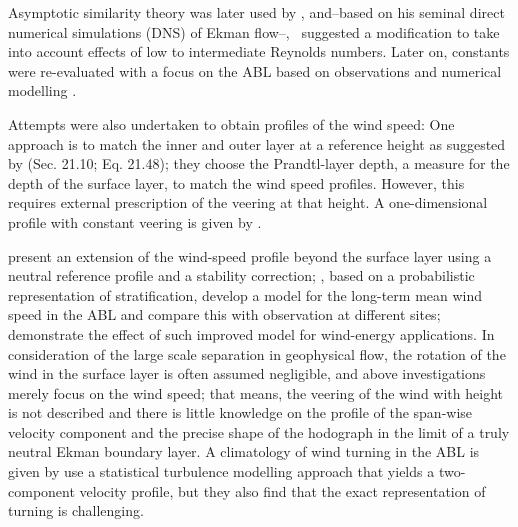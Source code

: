 \documentclass[smallcondensed,final]{svjour3}
\begin{document}
%
Asymptotic similarity theory was later used by \cite{tennekes:JAS1973, blackadar:JAS1968},
and--based on his seminal direct numerical simulations (DNS) of Ekman flow--,~\cite{spalart:JFM1989} suggested
a modification to take into account effects of low to intermediate Reynolds numbers.
Later on, constants were re-evaluated with a focus on the ABL based on
observations \citep{hogstrom:BM1988,hogstrom:BM1996}
and numerical modelling \citep{spalart:PF2008, spalart:PF2009, ansorge:BM2014, ansorge:BM2019}.
%
\par
%
Attempts were also undertaken to obtain profiles of the wind speed: 
One approach is to match the inner and outer layer at a reference height as suggested by
\cite{etling:2002, emeis:2018}  (Sec. 21.10; Eq. 21.48); they choose the Prandtl-layer depth, 
a measure for the depth of the surface layer, to match the wind speed profiles. 
However, this requires external prescription of the veering at that height. 
A one-dimensional profile with constant veering is given by \citet[Sec. 3; Eq. 3.1-3.19]{emeis:m2007}. 

\citet{gryning:BM2007} present an extension of the wind-speed profile beyond the surface layer
using a neutral reference profile and a stability correction;
\cite{kelly:BM2010}, based on a probabilistic representation of stratification,
develop a model for the long-term mean wind speed
in the ABL and compare this with observation at different sites; 
\cite{kelly:WE2016} demonstrate the effect of such improved model for wind-energy applications.
%
In consideration of the large scale separation in geophysical flow, the rotation of the wind in the
surface layer is often assumed negligible, and above investigations merely focus on the wind speed; 
that means, the veering of the wind with height is not described and there is little knowledge on the
profile of the span-wise velocity component and the precise shape of the hodograph in the limit of a
truly neutral Ekman boundary layer.
%
A climatology of wind turning in the ABL is given by \cite{lindvall:QJR2019} 
%
\cite{klein:PAM2021a} use a statistical turbulence modelling approach that yields a two-component velocity profile,
but they also find that the exact representation of turning is challenging.
\end{document}
